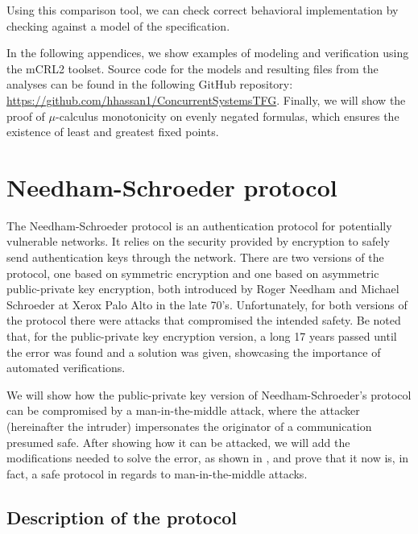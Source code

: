 \documentclass[11pt]{article}
\theoremstyle{definition}
\theoremstyle{plain}
\begin{document}
Using this comparison tool, we can check correct behavioral implementation by checking against a model of the specification. 
\newpage
\begin{appendices}
In the following appendices, we show examples of modeling and verification using the mCRL2 toolset. Source code for the models and resulting files from the analyses can be found in the following GitHub repository: \url{https://github.com/hhassan1/ConcurrentSystemsTFG}. Finally, we will show the proof of $ \mu $-calculus monotonicity on evenly negated formulas, which ensures the existence of least and greatest fixed points.
\section{Needham-Schroeder protocol}
The Needham-Schroeder protocol is an authentication protocol for potentially vulnerable networks. It relies on the security provided by encryption to safely send authentication keys through the network. There are two versions of the protocol, one based on symmetric encryption and one based on asymmetric public-private key encryption, both introduced by Roger Needham and Michael Schroeder at Xerox Palo Alto in the late 70's\cite{Needham:1978:UEA:359657.359659}. Unfortunately, for both versions of the protocol there were attacks that compromised the intended safety\cite{Denning:1981:TKD:358722.358740}\cite{Lowe:1995:ANP:219887.219895}. Be noted that, for the public-private key encryption version, a long 17 years passed until the error was found and a solution was given, showcasing the importance of automated verifications. 

We will show how the public-private key version of Needham-Schroeder's protocol can be compromised by a man-in-the-middle attack, where the attacker (hereinafter the intruder) impersonates the originator of a communication presumed safe. After showing how it can be attacked, we will add the modifications needed to solve the error, as shown in \cite{Lowe:1995:ANP:219887.219895}, and prove that it now is, in fact, a safe protocol in regards to man-in-the-middle attacks.

\subsection{Description of the protocol}


\end{appendices}
\end{document}
